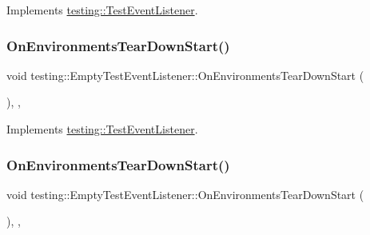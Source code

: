 Implements \mbox{\hyperlink{classtesting_1_1_test_event_listener_a468b5e6701bcb86cb2c956caadbba5e4}{testing\+::\+Test\+Event\+Listener}}.

\mbox{\label{classtesting_1_1_empty_test_event_listener_a320780451eac9178434b7c77d948ecbd}} 
\subsubsection{\texorpdfstring{OnEnvironmentsTearDownStart()}{OnEnvironmentsTearDownStart()}\hspace{0.1cm}{\footnotesize\ttfamily [2/3]}}
{\footnotesize\ttfamily void testing\+::\+Empty\+Test\+Event\+Listener\+::\+On\+Environments\+Tear\+Down\+Start (\begin{DoxyParamCaption}\item[{const \mbox{\hyperlink{classtesting_1_1_unit_test}{Unit\+Test}} \&}]{ }\end{DoxyParamCaption})\hspace{0.3cm}{\ttfamily [inline]}, {\ttfamily [override]}, {\ttfamily [virtual]}}



Implements \mbox{\hyperlink{classtesting_1_1_test_event_listener_a468b5e6701bcb86cb2c956caadbba5e4}{testing\+::\+Test\+Event\+Listener}}.

\mbox{\label{classtesting_1_1_empty_test_event_listener_a320780451eac9178434b7c77d948ecbd}} 
\subsubsection{\texorpdfstring{OnEnvironmentsTearDownStart()}{OnEnvironmentsTearDownStart()}\hspace{0.1cm}{\footnotesize\ttfamily [3/3]}}
{\footnotesize\ttfamily void testing\+::\+Empty\+Test\+Event\+Listener\+::\+On\+Environments\+Tear\+Down\+Start (\begin{DoxyParamCaption}\item[{const \mbox{\hyperlink{classtesting_1_1_unit_test}{Unit\+Test}} \&}]{ }\end{DoxyParamCaption})\hspace{0.3cm}{\ttfamily [inline]}, {\ttfamily [override]}, {\ttfamily [virtual]}}



